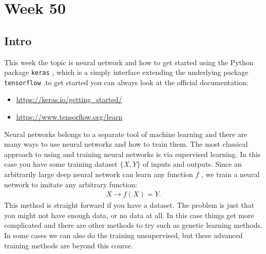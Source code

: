 \documentclass[11pt,a4paper]{article} %
\title{\titel}
\author{\navn}
\date{\dato}
\numberwithin{equation}{section}
\begin{document}

\maketitle

\section{Week 50}
	\subsection{Intro}
		This week the topic is neural network and how to get started using the Python package \texttt{keras} \cite{chollet:2015keras}, which is a simply interface extending the underlying package \texttt{tensorflow} \cite{tensorflow:2015whitepaper}.to get started you can always look at the official documentation:
		\begin{itemize}
			\item \url{https://keras.io/getting_started/}
			\item \url{https://www.tensorflow.org/learn}
		\end{itemize}	
	    Neural networks belongs to a separate tool of machine learning and there are many ways to use neural networks and how to train them. The most classical approach to using and training neural networks is via supervised learning. In this case you have some training dataset $\{X,Y\}$ of inputs and outputs. Since an arbitrarily large deep neural network can learn any function $f$ \cite{tegmark:2017}, we train a neural network to imitate any arbitrary function:
	    \begin{gather}
	    	X \rightarrow f(X)=Y.
	    \end{gather}
		This method is straight forward if you have a dataset. The problem is just that you might not have enough data, or no data at all. In this case things get more complicated and there are other methods to try such as genetic learning methods. In some cases we can also do the training unsupervised, but these advanced training methods are beyond this course.
		
\end{document}
